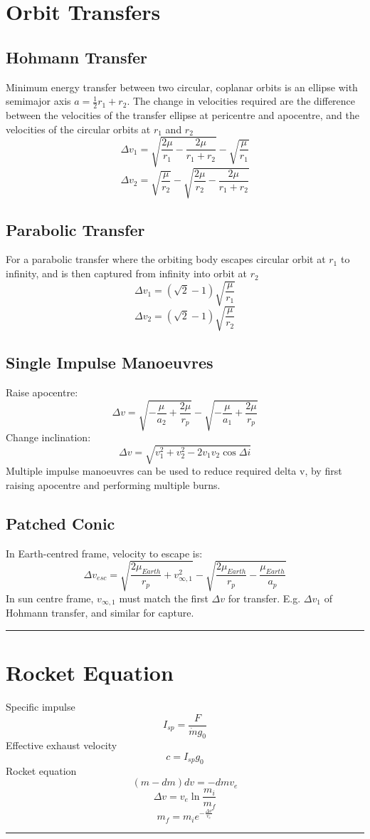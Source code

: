 \documentclass[table,cmyk]{article}
\begin{document}
\begin{longtable}
\section*{Orbit Transfers}
\subsection*{Hohmann Transfer}
Minimum energy transfer between two circular, coplanar orbits is an ellipse with semimajor axis $a = \frac{1}{2}r_1 + r_2$. The change in velocities required are the difference between the velocities of the transfer ellipse at pericentre and apocentre, and the velocities of the circular orbits at $r_1$ and $r_2$
\[\Delta v_1 = \sqrt{\frac{2\mu}{r_1}-\frac{2\mu}{r_1+r_2}}-\sqrt{\frac{\mu}{r_1}}\]
\[\Delta v_2 = \sqrt{\frac{\mu}{r_2}}-\sqrt{\frac{2\mu}{r_2}-\frac{2\mu}{r_1+r_2}}\]
\subsection*{Parabolic Transfer}
For a parabolic transfer where the orbiting body escapes circular orbit at $r_1$ to infinity, and is then captured from infinity into orbit at $r_2$
\[\Delta v_1 = (\sqrt{2}-1)\sqrt{\frac{\mu}{r_1}}\]
\[\Delta v_2 = (\sqrt{2}-1)\sqrt{\frac{\mu}{r_2}}\]
\subsection*{Single Impulse Manoeuvres}
Raise apocentre:
\[\Delta v = \sqrt{-\frac{\mu}{a_2}+\frac{2\mu}{r_p}}-\sqrt{-\frac{\mu}{a_1}+\frac{2\mu}{r_p}}\]
Change inclination:
\[\Delta v = \sqrt{v_1^2+v_2^2-2v_1v_2\cos \Delta i}\]
Multiple impulse manoeuvres can be used to reduce required delta v, by first raising apocentre and performing multiple burns.
\subsection*{Patched Conic}
In Earth-centred frame, velocity to escape is:
\[\Delta v_{esc} = \sqrt{\frac{2\mu_{Earth}}{r_p}+v_{\infty,1}^2}-\sqrt{\frac{2\mu_{Earth}}{r_p}-\frac{\mu_{Earth}}{a_p}}\]
\tabularnewline\hline
In sun centre frame, $v_{\infty,1}$ must match the first $\Delta v$ for transfer. E.g. $\Delta v_1$ of Hohmann transfer, and similar for capture.
\noindent\rule{9cm}{0.4pt}
\section*{Rocket Equation}
Specific impulse
\[I_{sp} = \frac{F}{\dot{m}g_0}\]
Effective exhaust velocity
\[c=I_{sp}g_0\]
Rocket equation
\[(m-dm)dv = -dmv_e\]
\[\Delta v = v_e \ln \frac{m_i}{m_f}\]
\[m_f = m_i e^{-\frac{\Delta v}{v_e}}\]
\noindent\rule{9cm}{0.4pt}

\end{longtable}
\end{document}

